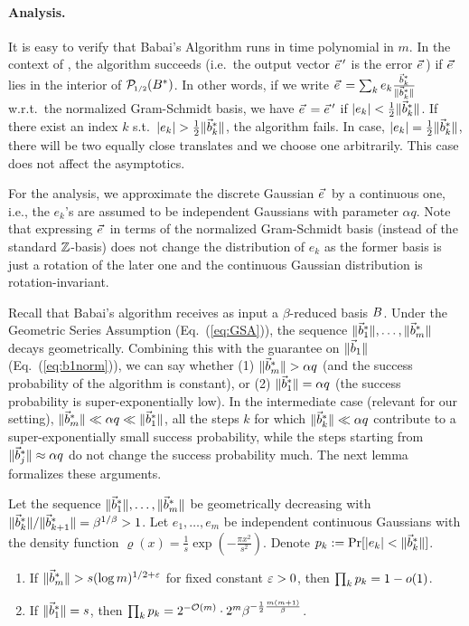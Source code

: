 \paragraph{Analysis.} It is easy to verify that Babai's Algorithm runs in time polynomial in $m$. In the context of \LWE, the algorithm succeeds (i.e.\ the output vector $\evec'$ is the \LWE error $\evec$) if $\evec$ lies in the interior of $\smash{\mathcal{P}\mkern-3mu_{\mbox{\tiny 1/2}}}(B^*)$. In other words, if we write $\evec = \sum_k e_k \frac{\wbvec_k}{ \| \wbvec_k \|}$ w.r.t.\ the normalized Gram-Schmidt basis, we have $\evec = \evec'$ if $\left|e_k\right| < \tfrac{1}{2} \|\vec b^*_k \|$. If there exist an index $k$ s.t.\ $\left|e_k\right| > \tfrac{1}{2} \|\vec b^*_k \|$, the algorithm fails. In case, $\left|e_k\right| = \tfrac{1}{2} \|\vec b^*_k \|$, there will be two equally close translates and we choose one arbitrarily. This case does not affect the asymptotics.

For the analysis, we approximate the discrete Gaussian $\evec$ by a continuous one, i.e., the $e_k$'s are assumed to be independent Gaussians with parameter $\alpha q$. Note that expressing $\evec$ in terms of the normalized Gram-Schmidt basis (instead of the standard ${{\mathbb Z}}$-basis) does not change the distribution of $e_k$ as the former basis is just a rotation of the later one and the continuous Gaussian distribution is rotation-invariant. 

Recall that Babai's algorithm receives as input a $\beta$-\BKZ reduced basis $B$. Under the Geometric Series Assumption (Eq.~(\ref{eq:GSA})), the sequence $\| \vec b^*_1 \|, \ldots, \| \vec b^*_m\|$ decays geometrically. Combining this with the guarantee on $\| \vec b_1\|$ (Eq.~(\ref{eq:b1norm})), we can say whether (1) $\| \wbvec_m\|> \alpha q$ (and the success probability of the algorithm is constant), or (2) $\| \vec b^*_1 \| = \alpha q$ (the success probability is super-exponentially low). In the intermediate case (relevant for our \LWE setting), $ \| \vec b^*_m \| \ll \alpha q \ll \| \vec b^*_1 \|$, all the steps $k$ for which $\| \vec b^*_k \| \ll \alpha q $ contribute to a super-exponentially small success probability, while the steps starting from $\| \vec b^*_j \| \approx \alpha q$ do not change the success probability much. The next lemma formalizes these arguments.

\begin{lemma} \label{lem:BabaiHelpingLemma}
Let the sequence $\|\vec b^*_1 \|, \ldots, \|\vec b^*_m \|$ be geometrically decreasing with $\|\vec b^*_k \| / \|\vec b^*_{k+1} \| = \beta^{1/ \beta} >1$. Let $e_1, \ldots, e_m$ be independent continuous Gaussians with the density function $\varrho(x) = \tfrac{1}{s} \exp(-\frac{\pi x^2}{s^2})$. Denote $p_k := \Pr[ \left|e_k\right| < \| \vec b^*_k \|]$.
	\begin{enumerate}
		\item If $\| \vec b^*_m \| > s (\log{m})^{1/2 + \varepsilon}$ for fixed constant $\varepsilon>0$, then $\prod_k p_k = 1 - o(1)$.
		\item If $\| \vec b^*_1 \| = s$, then $\prod_k p_k = 2^{-\mathcal{O}(m)} \cdot 2^m \beta^{-\frac{1}{2} \frac{m(m+1)}{\beta}}$.
	\end{enumerate}
\end{lemma}  


